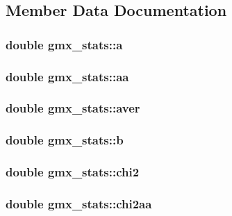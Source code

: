 \subsection{\-Member \-Data \-Documentation}
\hypertarget{structgmx__stats_a8ea3f1a34d74c21abbbc9ce1cd300a57}{
\subsubsection[{a}]{\setlength{\rightskip}{0pt plus 5cm}double {\bf gmx\-\_\-stats\-::a}}}\label{structgmx__stats_a8ea3f1a34d74c21abbbc9ce1cd300a57}
\hypertarget{structgmx__stats_a4482e7837a53bcff31c0b5e79a7cc193}{
\subsubsection[{aa}]{\setlength{\rightskip}{0pt plus 5cm}double {\bf gmx\-\_\-stats\-::aa}}}\label{structgmx__stats_a4482e7837a53bcff31c0b5e79a7cc193}
\hypertarget{structgmx__stats_a5dff345ff0e49f647e57c05094bc23e9}{
\subsubsection[{aver}]{\setlength{\rightskip}{0pt plus 5cm}double {\bf gmx\-\_\-stats\-::aver}}}\label{structgmx__stats_a5dff345ff0e49f647e57c05094bc23e9}
\hypertarget{structgmx__stats_a8ba2b2d7793176d55c85cf63832928a2}{
\subsubsection[{b}]{\setlength{\rightskip}{0pt plus 5cm}double {\bf gmx\-\_\-stats\-::b}}}\label{structgmx__stats_a8ba2b2d7793176d55c85cf63832928a2}
\hypertarget{structgmx__stats_a2fc31020e2bd53cbed7c051a5e55de32}{
\subsubsection[{chi2}]{\setlength{\rightskip}{0pt plus 5cm}double {\bf gmx\-\_\-stats\-::chi2}}}\label{structgmx__stats_a2fc31020e2bd53cbed7c051a5e55de32}
\hypertarget{structgmx__stats_a35d340af74cf194673de504ef6d93499}{
\subsubsection[{chi2aa}]{\setlength{\rightskip}{0pt plus 5cm}double {\bf gmx\-\_\-stats\-::chi2aa}}}\label{structgmx__stats_a35d340af74cf194673de504ef6d93499}
